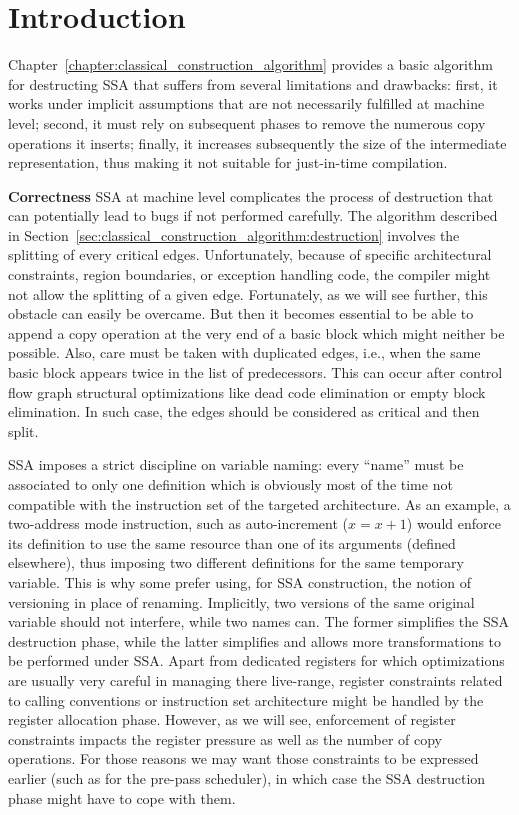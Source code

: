 \section{Introduction}
Chapter~\ref{chapter:classical_construction_algorithm} provides a basic algorithm for destructing SSA that suffers from several limitations and drawbacks: first, it works under implicit assumptions that are not necessarily fulfilled at machine level; second, it must rely on subsequent phases to remove the numerous copy operations it inserts; finally, it increases subsequently the size of the intermediate representation, thus making it not suitable for just-in-time compilation.   

{\bf Correctness}
SSA at machine level complicates the process of destruction that can potentially lead to bugs if not performed carefully. The algorithm described in Section~\ref{sec:classical_construction_algorithm:destruction} involves the splitting of every critical edges. Unfortunately, because of specific architectural constraints, region boundaries, or exception handling code, the compiler might not allow the splitting of a given edge. Fortunately, as we will see further, this obstacle can easily be overcame. But then it becomes essential to be able to append a copy operation at the very end of a basic block which might neither be possible. Also, care must be taken with duplicated edges, i.e., when the same basic block appears twice in the list of predecessors.
This can occur after control flow graph structural optimizations like
dead code elimination or empty block elimination.
In such case, the edges should be considered as critical and then split.

SSA imposes a strict discipline on variable naming: every ``name'' must be associated to only one definition which is obviously most of the time not compatible with the instruction set of the targeted architecture. As an example, a two-address mode instruction, such as auto-increment ($x=x+1$) would enforce its definition to use the same resource than one of its arguments (defined elsewhere), thus imposing two different definitions for the same temporary variable. This is why some prefer using, for SSA construction, the notion of versioning in place of renaming. Implicitly, two versions of the same original variable should not interfere, while two names can. The former simplifies the SSA destruction phase, while the latter simplifies and allows more transformations to be performed under SSA. Apart from dedicated registers for which optimizations are usually very careful in managing there live-range, register constraints related to calling conventions or instruction set architecture might be handled by the register allocation phase. However, as we will see, enforcement of register constraints impacts the register pressure as well as the number of copy operations. For those reasons we may want those constraints to be expressed earlier (such as for the pre-pass scheduler), in which case the SSA destruction phase might have to cope with them.


